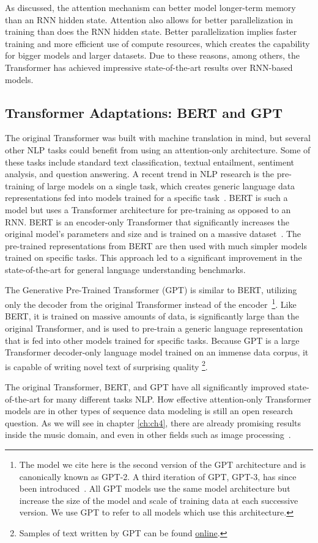 As discussed, the attention mechanism can better model longer-term memory than an RNN hidden state. Attention also allows for better parallelization in training than does the RNN hidden state. Better parallelization implies faster training and more efficient use of compute resources, which creates the capability for bigger models and larger datasets. Due to these reasons, among others, the Transformer has achieved impressive state-of-the-art results over RNN-based models. 

\subsection{Transformer Adaptations: BERT and GPT}
The original Transformer was built with machine translation in mind, but several other NLP tasks could benefit from using an attention-only architecture. Some of these tasks include standard text classification, textual entailment, sentiment analysis, and question answering. A recent trend in NLP research is the pre-training of large models on a single task, which creates generic language data representations fed into models trained for a specific task~\cite{peters2018deep}. BERT is such a model but uses a Transformer architecture for pre-training as opposed to an RNN. BERT is an encoder-only Transformer that significantly increases the original model's parameters and size and is trained on a massive dataset~\cite{devlin2018bert}. The pre-trained representations from BERT are then used with much simpler models trained on specific tasks. This approach led to a significant improvement in the state-of-the-art for general language understanding benchmarks.  

The Generative Pre-Trained Transformer (GPT) is similar to BERT, utilizing only the decoder from the original Transformer instead of the encoder~\cite{radford2019language}\footnote{The model we cite here is the second version of the GPT architecture and is canonically known as GPT-2. A third iteration of GPT, GPT-3, has since been introduced~\cite{brown2020language}. All GPT models use the same model architecture but increase the size of the model and scale of training data at each successive version. We use GPT to refer to all models which use this architecture.}. Like BERT, it is trained on massive amounts of data, is significantly large than the original Transformer, and is used to pre-train a generic language representation that is fed into other models trained for specific tasks. Because GPT is a large Transformer decoder-only language model trained on an immense data corpus, it is capable of writing novel text of surprising quality%
\footnote{Samples of text written by GPT can be found \href{https://openai.com/blog/better-language-models/}{online}.}. 

The original Transformer, BERT, and GPT have all significantly improved state-of-the-art for many different tasks NLP. How effective attention-only Transformer models are in other types of sequence data modeling is still an open research question. As we will see in chapter \ref{ch:ch4}, there are already promising results inside the music domain, and even in other fields such as image processing~\cite{dosovitskiy2020image}. 


 